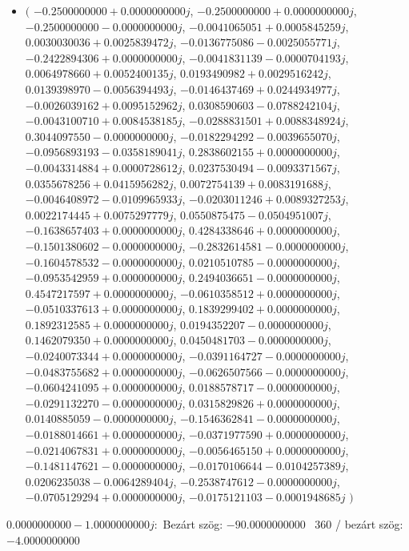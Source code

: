 \documentclass[14pt,a4paper]{article}
\begin{document}
\begin{itemize}
\item
$\big($
$-0.2500000000+0.0000000000j$, $-0.2500000000+0.0000000000j$, $-0.2500000000-0.0000000000j$, $-0.0041065051+0.0005845259j$, $0.0030030036+0.0025839472j$, $-0.0136775086-0.0025055771j$, $-0.2422894306+0.0000000000j$, $-0.0041831139-0.0000704193j$, $0.0064978660+0.0052400135j$, $0.0193490982+0.0029516242j$, $0.0139398970-0.0056394493j$, $-0.0146437469+0.0244934977j$, $-0.0026039162+0.0095152962j$, $0.0308590603-0.0788242104j$, $-0.0043100710+0.0084538185j$, $-0.0288831501+0.0088348924j$, $0.3044097550-0.0000000000j$, $-0.0182294292-0.0039655070j$, $-0.0956893193-0.0358189041j$, $0.2838602155+0.0000000000j$, $-0.0043314884+0.0000728612j$, $0.0237530494-0.0093371567j$, $0.0355678256+0.0415956282j$, $0.0072754139+0.0083191688j$, $-0.0046408972-0.0109965933j$, $-0.0203011246+0.0089327253j$, $0.0022174445+0.0075297779j$, $0.0550875475-0.0504951007j$, $-0.1638657403+0.0000000000j$, $0.4284338646+0.0000000000j$, $-0.1501380602-0.0000000000j$, $-0.2832614581-0.0000000000j$, $-0.1604578532-0.0000000000j$, $0.0210510785-0.0000000000j$, $-0.0953542959+0.0000000000j$, $0.2494036651-0.0000000000j$, $0.4547217597+0.0000000000j$, $-0.0610358512+0.0000000000j$, $-0.0510337613+0.0000000000j$, $0.1839299402+0.0000000000j$, $0.1892312585+0.0000000000j$, $0.0194352207-0.0000000000j$, $0.1462079350+0.0000000000j$, $0.0450481703-0.0000000000j$, $-0.0240073344+0.0000000000j$, $-0.0391164727-0.0000000000j$, $-0.0483755682+0.0000000000j$, $-0.0626507566-0.0000000000j$, $-0.0604241095+0.0000000000j$, $0.0188578717-0.0000000000j$, $-0.0291132270-0.0000000000j$, $0.0315829826+0.0000000000j$, $0.0140885059-0.0000000000j$, $-0.1546362841-0.0000000000j$, $-0.0188014661+0.0000000000j$, $-0.0371977590+0.0000000000j$, $-0.0214067831+0.0000000000j$, $-0.0056465150+0.0000000000j$, $-0.1481147621-0.0000000000j$, $-0.0170106644-0.0104257389j$, $0.0206235038-0.0064289404j$, $-0.2538747612-0.0000000000j$, $-0.0705129294+0.0000000000j$, $-0.0175121103-0.0001948685j$
$\big)$
\end{itemize}
$0.0000000000-1.0000000000j$:\
Bezárt szög: $-90.0000000000$ \
360 / bezárt szög: $-4.0000000000$\
\end{document}
